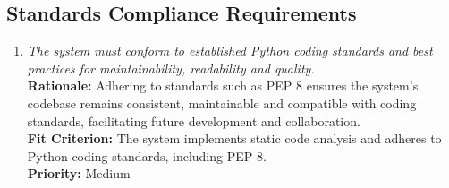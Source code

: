 \documentclass[12pt]{article}
\begin{document}
\subsection{Standards Compliance Requirements}
\begin{enumerate}[label=CR-SCR \arabic*., wide=0pt, leftmargin=*]
  \item \emph{The system must conform to established Python coding
      standards and best practices for maintainability, readability and
    quality.}\\[2mm]
    {\bf Rationale:} Adhering to standards such as PEP 8 ensures the
    system’s codebase remains consistent, maintainable and compatible
    with coding standards, facilitating future development and collaboration.\\
    {\bf Fit Criterion:} The system implements static code analysis
    and adheres to Python coding standards, including PEP 8.\\
    {\bf Priority:} Medium
\end{enumerate}
\end{document}

